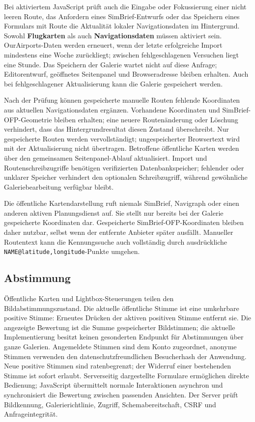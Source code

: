 \documentclass[11pt,a4paper]{article}
\newcommand{\ui}[1]{\textbf{#1}}
\newcommand{\codeword}[1]{\nolinkurl{#1}}
\begin{document}
Bei aktiviertem JavaScript prüft auch die Eingabe oder Fokussierung einer nicht
leeren Route, das Anfordern eines SimBrief-Entwurfs oder das Speichern eines
Formulars mit Route die Aktualität lokaler Navigationsdaten im Hintergrund.
Sowohl \ui{Flugkarten} als auch \ui{Navigationsdaten} müssen aktiviert sein.
OurAirports-Daten werden erneuert, wenn der letzte erfolgreiche Import
mindestens eine Woche zurückliegt; zwischen fehlgeschlagenen Versuchen liegt
eine Stunde. Das Speichern der Galerie wartet nicht auf diese Anfrage;
Editorentwurf, geöffnetes Seitenpanel und Browseradresse bleiben erhalten. Auch
bei fehlgeschlagener Aktualisierung kann die Galerie gespeichert werden.

Nach der Prüfung können gespeicherte manuelle Routen fehlende Koordinaten aus
aktuellen Navigationsdaten ergänzen. Vorhandene Koordinaten und
SimBrief-OFP-Geometrie bleiben erhalten; eine neuere Routenänderung oder
Löschung verhindert, dass das Hintergrundresultat diesen Zustand überschreibt.
Nur gespeicherte Routen werden vervollständigt; ungespeicherter Browsertext wird
mit der Aktualisierung nicht übertragen. Betroffene öffentliche Karten werden
über den gemeinsamen Seitenpanel-Ablauf aktualisiert. Import und
Routenschreibzugriffe benötigen verifizierten Datenbankspeicher; fehlender oder
unklarer Speicher verhindert den optionalen Schreibzugriff, während gewöhnliche
Galeriebearbeitung verfügbar bleibt.

Die öffentliche Kartendarstellung ruft niemals SimBrief, Navigraph oder einen
anderen aktiven Planungsdienst auf. Sie stellt nur bereits bei der Galerie
gespeicherte Koordinaten dar. Gespeicherte SimBrief-OFP-Koordinaten bleiben
daher nutzbar, selbst wenn der entfernte Anbieter später ausfällt. Manueller
Routentext kann die Kennungssuche auch vollständig durch ausdrückliche
\codeword{NAME@latitude,longitude}-Punkte umgehen.

\subsection{Abstimmung}

Öffentliche Karten und Lightbox-Steuerungen teilen den Bildabstimmungszustand.
Die aktuelle öffentliche Stimme ist eine umkehrbare positive Stimme: Erneutes
Drücken der aktiven positiven Stimme entfernt sie. Die angezeigte Bewertung ist
die Summe gespeicherter Bildstimmen; die aktuelle Implementierung besitzt keinen
gesonderten Endpunkt für Abstimmungen über ganze Galerien. Angemeldete Stimmen
sind dem Konto zugeordnet, anonyme Stimmen verwenden den datenschutzfreundlichen
Besucherhash der Anwendung. Neue positive Stimmen sind ratenbegrenzt; der
Widerruf einer bestehenden Stimme ist sofort erlaubt. Serverseitig dargestellte
Formulare ermöglichen direkte Bedienung; JavaScript übermittelt normale
Interaktionen asynchron und synchronisiert die Bewertung zwischen passenden
Ansichten. Der Server prüft Bildkennung, Galerierichtlinie, Zugriff,
Schemabereitschaft, CSRF und Anfrageintegrität.
\end{document}
